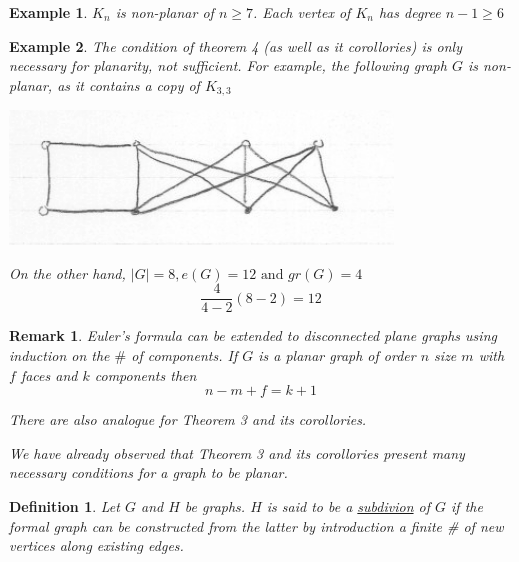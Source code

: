 \documentclass[12pt]{article}
\newtheorem{example}{Example}
\newtheorem{definition}{Definition}
\newtheorem*{remark}{Remark}
\begin{document}
\begin{example}
	$K_{n}$ is non-planar of $n\ge 7$. Each vertex of $K_{n}$ has degree $n-1 \ge 6$
\end{example}

\begin{example}
	The condition of theorem 4 (as well as it corollories) is only necessary for planarity, not sufficient. For example, the following graph $G$ is non-planar, as it contains a copy of $K_{3,3}$

	\begin{center}
		\includegraphics[scale=0.5]{k3_non_planar}
	\end{center}

	On the other hand, $\vert G\vert =8, e(G) = 12 \text{ and } gr(G) = 4$
	\[\frac{4}{4-2} (8-2) = 12\]
\end{example}

\begin{remark}
	Euler's formula can be extended to disconnected plane graphs using induction on the $\#$ of components. If $G$ is a planar graph of order $n$ size $m$ with $f$ faces and $k$ components then
	\[n- m + f = k +1\]

	There are also analogue for Theorem 3 and its corollories.

	We have already observed that Theorem 3 and its corollories present many necessary conditions for a graph to be planar.

\end{remark}


\begin{definition}
	Let $G$ and $H$ be graphs. $H$ is said to be a \underline{subdivion} of $G$ if the formal graph can be constructed from the latter by introduction a finite \# of new vertices along existing edges.
\end{definition}
\end{document}
